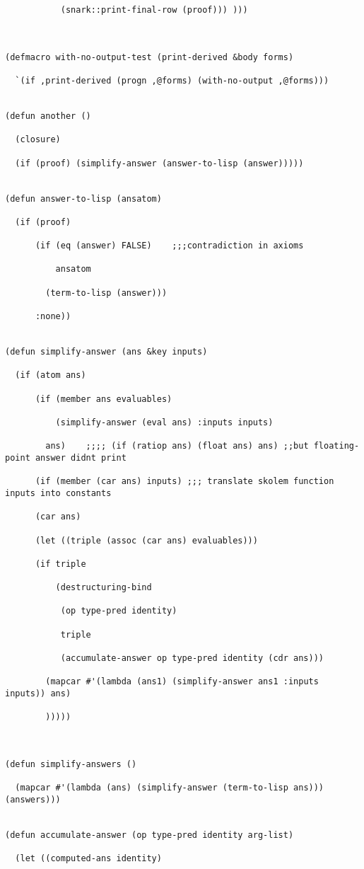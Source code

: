 \begin{lstlisting}
		   (snark::print-final-row (proof))) )))



(defmacro with-no-output-test (print-derived &body forms)

  `(if ,print-derived (progn ,@forms) (with-no-output ,@forms)))


(defun another ()

  (closure)

  (if (proof) (simplify-answer (answer-to-lisp (answer)))))


(defun answer-to-lisp (ansatom)

  (if (proof)

      (if (eq (answer) FALSE)    ;;;contradiction in axioms

          ansatom

        (term-to-lisp (answer)))

      :none))


(defun simplify-answer (ans &key inputs)

  (if (atom ans)

      (if (member ans evaluables)

          (simplify-answer (eval ans) :inputs inputs)

        ans)    ;;;; (if (ratiop ans) (float ans) ans) ;;but floating-point answer didnt print

      (if (member (car ans) inputs) ;;; translate skolem function inputs into constants

	  (car ans)

	  (let ((triple (assoc (car ans) evaluables)))

      (if triple

          (destructuring-bind 

           (op type-pred identity) 

           triple

           (accumulate-answer op type-pred identity (cdr ans)))

        (mapcar #'(lambda (ans1) (simplify-answer ans1 :inputs inputs)) ans)

        )))))



(defun simplify-answers ()

  (mapcar #'(lambda (ans) (simplify-answer (term-to-lisp ans))) (answers)))


(defun accumulate-answer (op type-pred identity arg-list)

  (let ((computed-ans identity)


\end{lstlisting}
